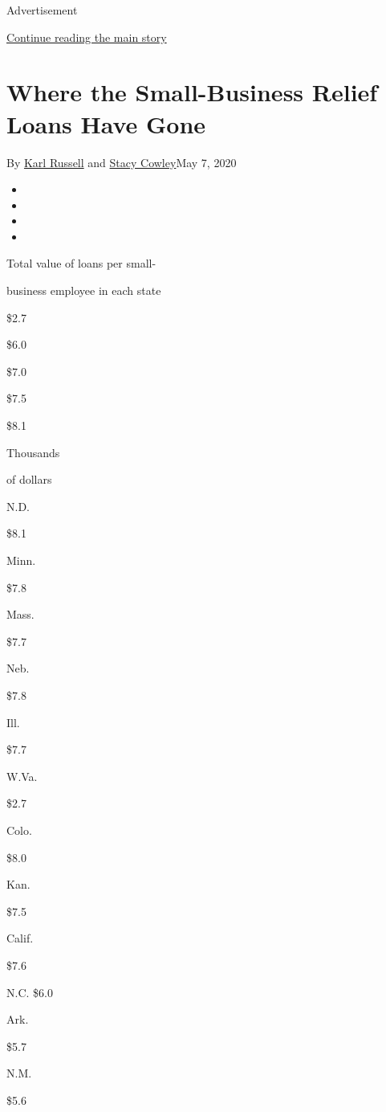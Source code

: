 Advertisement

\protect\hyperlink{after-top}{Continue reading the main story}

\hypertarget{where-the-small-business-relief-loans-have-gone}{%
\section{Where the Small-Business Relief Loans Have
Gone}\label{where-the-small-business-relief-loans-have-gone}}

By \href{https://www.nytimes.com/by/karl-russell}{Karl Russell} and
\href{https://www.nytimes.com/by/stacy-cowley}{Stacy Cowley}May 7, 2020

\begin{itemize}
\item
\item
\item
\item
\end{itemize}

Total value of loans per small-

business employee in each state

\$2.7

\$6.0

\$7.0

\$7.5

\$8.1

Thousands

of dollars

N.D.

\$8.1

Minn.

\$7.8

Mass.

\$7.7

Neb.

\$7.8

Ill.

\$7.7

W.Va.

\$2.7

Colo.

\$8.0

Kan.

\$7.5

Calif.

\$7.6

N.C. \$6.0

Ark.

\$5.7

N.M.

\$5.6

